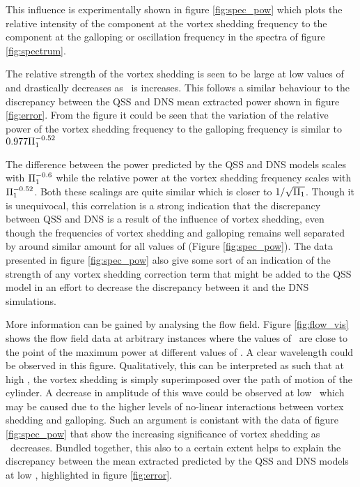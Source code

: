 This influence is experimentally shown in figure \ref{fig:spec_pow} which plots the relative intensity of the component at the vortex shedding frequency to the component at the galloping or oscillation frequency in the spectra of figure \ref{fig:spectrum}.



The relative strength of the vortex shedding is seen to be large at low values of \massstiff and drastically decreases as \massstiff\ is increases. This follows a similar behaviour to the discrepancy between the QSS and DNS mean extracted power shown in figure \ref{fig:error}. From the figure it could be seen that the variation of the relative power of the vortex shedding frequency to the galloping frequency is similar to  $0.977\Pi_1^{-0.52}$ 

The difference between the power predicted by the QSS and DNS models scales with $\Pi_1^{-0.6}$ while the relative power at the vortex shedding frequency scales with $\Pi_1^{-0.52}$. Both these scalings are quite similar which is closer to $1/\sqrt{\Pi_1}$. Though it is unequivocal, this correlation is a strong indication that the discrepancy between QSS and DNS is a result of the influence of vortex shedding, even though the frequencies of vortex shedding and galloping remains well separated by around similar amount for all values of \massstiff (Figure \ref{fig:spec_pow}). The data presented in figure \ref{fig:spec_pow} also give some sort of an indication of the strength of any vortex shedding correction term that might be added to the QSS model in an effort to decrease the discrepancy between it and the DNS simulations.





More information can be gained by analysing the flow field. Figure \ref{fig:flow_vis} shows the flow field data at arbitrary instances where the values of \massdamp\ are close to the point of the maximum power at different values of \massstiff. A clear wavelength could be observed in this figure. Qualitatively, this can be interpreted as such that at high \massstiff, the vortex shedding is simply superimposed over the path of motion of the cylinder. A decrease in amplitude of this wave could be observed at low \massstiff\ which may be caused due to the higher levels of no-linear interactions between vortex shedding and galloping. Such an argument is conistant with the data of figure \ref{fig:spec_pow} that show the increasing significance of vortex shedding as \massstiff\ decreases. Bundled together, this also to a certain extent helps to explain the discrepancy between the mean extracted predicted by the QSS and DNS models at low \massstiff, highlighted in figure \ref{fig:error}.


